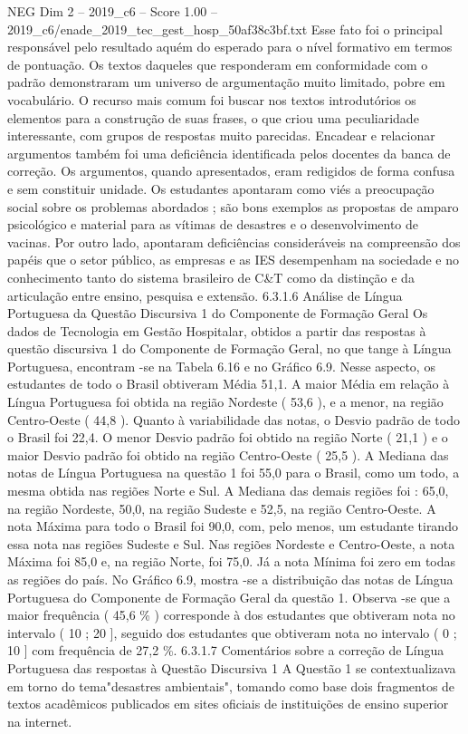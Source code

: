 \begin{textsample}{NEG Dim 2 – 2019\_c6 – Score 1.00 – 2019\_c6/enade\_2019\_tec\_gest\_hosp\_50af38c3bf.txt}
Esse fato foi o principal responsável pelo resultado aquém do esperado para o nível formativo em termos de pontuação.
Os textos daqueles que responderam em conformidade com o padrão demonstraram um universo de argumentação muito limitado, pobre em vocabulário.
O recurso mais comum foi buscar nos textos introdutórios os elementos para a construção de suas frases, o que criou uma peculiaridade interessante, com grupos de respostas muito parecidas.
Encadear e relacionar argumentos também foi uma deficiência identificada pelos docentes da banca de correção.
Os argumentos, quando apresentados, eram redigidos de forma confusa e sem constituir unidade.
Os estudantes apontaram como viés a preocupação social sobre os problemas abordados ; são bons exemplos as propostas de amparo psicológico e material para as vítimas de desastres e o desenvolvimento de vacinas.
Por outro lado, apontaram deficiências consideráveis na compreensão dos papéis que o setor público, as empresas e as IES desempenham na sociedade e no conhecimento tanto do sistema brasileiro de C\&T como da distinção e da articulação entre ensino, pesquisa e extensão. 6.3.1.6 Análise de Língua Portuguesa da Questão Discursiva 1 do Componente de Formação Geral Os dados de Tecnologia em Gestão Hospitalar, obtidos a partir das respostas à questão discursiva 1 do Componente de Formação Geral, no que tange à Língua Portuguesa, encontram -se na Tabela 6.16 e no Gráfico 6.9.
Nesse aspecto, os estudantes de todo o Brasil obtiveram Média 51,1.
A maior Média em relação à Língua Portuguesa foi obtida na região Nordeste ( 53,6 ), e a menor, na região Centro-Oeste ( 44,8 ).
Quanto à variabilidade das notas, o Desvio padrão de todo o Brasil foi 22,4.
O menor Desvio padrão foi obtido na região Norte ( 21,1 ) e o maior Desvio padrão foi obtido na região Centro-Oeste ( 25,5 ).
A Mediana das notas de Língua Portuguesa na questão 1 foi 55,0 para o Brasil, como um todo, a mesma obtida nas regiões Norte e Sul.
A Mediana das demais regiões foi : 65,0, na região Nordeste, 50,0, na região Sudeste e 52,5, na região Centro-Oeste.
A nota Máxima para todo o Brasil foi 90,0, com, pelo menos, um estudante tirando essa nota nas regiões Sudeste e Sul.
Nas regiões Nordeste e Centro-Oeste, a nota Máxima foi 85,0 e, na região Norte, foi 75,0.
Já a nota Mínima foi zero em todas as regiões do país.
No Gráfico 6.9, mostra -se a distribuição das notas de Língua Portuguesa do Componente de Formação Geral da questão 1.
Observa -se que a maior frequência ( 45,6 \% ) corresponde à dos estudantes que obtiveram nota no intervalo ( 10 ; 20 ], seguido dos estudantes que obtiveram nota no intervalo ( 0 ; 10 ] com frequência de 27,2 \%. 6.3.1.7 Comentários sobre a correção de Língua Portuguesa das respostas à Questão Discursiva 1 A Questão 1 se contextualizava em torno do tema"desastres ambientais", tomando como base dois fragmentos de textos acadêmicos publicados em sites oficiais de instituições de ensino superior na internet.

\end{textsample}
